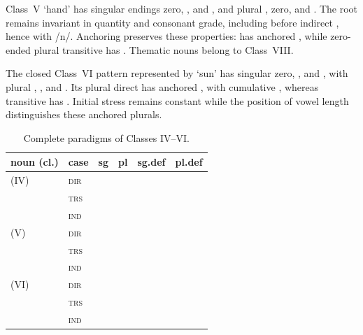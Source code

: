 Class~V  `hand' has singular endings zero, , and , and
plural , zero, and . The root  remains invariant
in quantity and consonant grade, including before indirect , hence
 with /n/. Anchoring preserves these properties: 
has anchored , while zero-ended plural transitive 
has . Thematic  nouns belong to Class~VIII.

The closed Class~VI pattern represented by  `sun' has singular zero,
, and , with plural , , and
. Its plural direct has anchored , with cumulative
, whereas transitive  has . Initial
stress remains constant while the position of vowel length distinguishes
these anchored plurals.

\begin{table}[ht]
  \footnotesize
  \caption{Complete paradigms of Classes IV--VI.}
  \label{tab:nm-paradigms-iv-vi}
  \begin{tabularx}{\textwidth}{l l L L L L}
    \toprule
    {\sc noun (cl.)} & {\sc case} & {\sc sg} & {\sc pl}
      & {\sc sg.def} & {\sc pl.def} \\
    \midrule
     (IV) & \textsc{dir} &  &  &  &  \\
     & \textsc{trs} &  &  &  &  \\
     & \textsc{ind} &  &  &  &  \\
    \addlinespace
     (V) & \textsc{dir} &  &  &  &  \\
     & \textsc{trs} &  &  &  &  \\
     & \textsc{ind} &  &  &  &  \\
    \addlinespace
     (VI) & \textsc{dir} &  &  &  &  \\
     & \textsc{trs} &  &  &  &  \\
     & \textsc{ind} &  &  &  &  \\
    \bottomrule
  \end{tabularx}
\end{table}
\FloatBarrier

